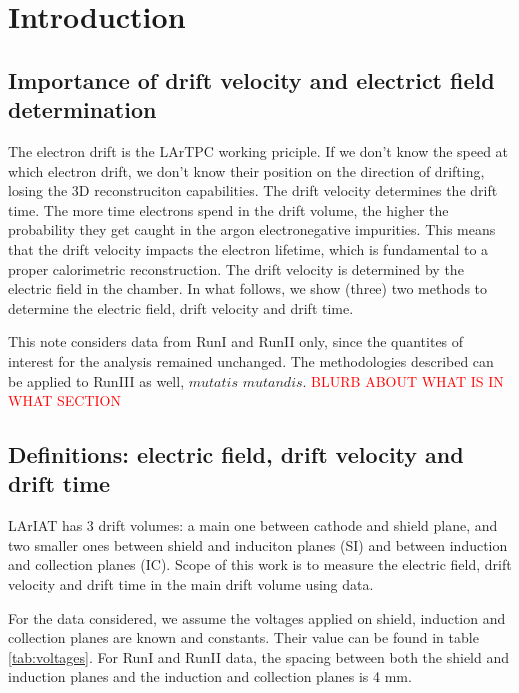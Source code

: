 \section{Introduction}\label{sec:Introduction}

\subsection{Importance of drift velocity and electrict field determination}\label{sec:Intro}
The electron drift is the LArTPC working priciple. If we don't know the speed at which electron drift, we don't know their position on the direction of drifting, losing the 3D reconstruciton capabilities. The drift velocity determines the drift time. The more time electrons spend in the drift volume, the higher the probability they get caught in the argon electronegative impurities. This means that the drift velocity impacts the electron lifetime, which is fundamental to a proper calorimetric reconstruction. The drift velocity is determined by the electric field in the chamber. In what follows, we show (three) two methods to determine the electric field, drift velocity and drift time.

This note considers data from RunI and RunII only, since the quantites of interest for the analysis remained unchanged. The methodologies described can be applied to RunIII as well, $mutatis$ $mutandis$. 
\textcolor{red}{BLURB ABOUT WHAT IS IN WHAT SECTION}


\subsection{Definitions: electric field, drift velocity and drift time }\label{sec:Def}
LArIAT has 3 drift volumes: a main one between cathode and shield plane, and two smaller ones between shield and induciton planes (SI) and between induction and collection planes (IC). Scope of this work is to measure the electric field, drift velocity and drift time in the main drift volume using data.

For the data considered, we assume the voltages applied on shield, induction and collection planes are known and constants. Their value can be found in table \ref{tab:voltages}.
For RunI and RunII data, the spacing between both the shield and induction planes and the induction and collection planes is 4 mm. 

